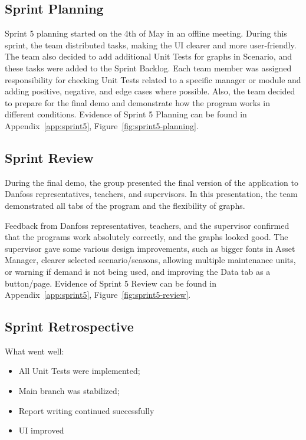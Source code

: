 

\subsection*{Sprint Planning}

Sprint 5 planning started on the 4th of May in an offline meeting. During this sprint, the team distributed tasks, making the UI clearer and more user-friendly. The team also decided to add additional Unit Tests for graphs in Scenario, and these tasks were added to the Sprint Backlog. Each team member was assigned responsibility for checking Unit Tests related to a specific manager or module and adding positive, negative, and edge cases where possible. Also, the team decided to prepare for the final demo and demonstrate how the program works in different conditions. Evidence of Sprint 5 Planning can be found in Appendix~\ref{app:sprint5}, Figure~\ref{fig:sprint5-planning}.


 

\subsection*{Sprint Review}

During the final demo, the group presented the final version of the application to Danfoss representatives, teachers, and supervisors. In this presentation, the team demonstrated all tabs of the program and the flexibility of graphs.

Feedback from Danfoss representatives, teachers, and the supervisor confirmed that the programs work absolutely correctly, and the graphs looked good. The supervisor gave some various design improvements, such as bigger fonts in Asset Manager, clearer selected scenario/seasons, allowing multiple maintenance units, or warning if demand is not being used, and improving the Data tab as a button/page. Evidence of Sprint 5 Review can be found in Appendix~\ref{app:sprint5}, Figure~\ref{fig:sprint5-review}.
 

\subsection*{Sprint Retrospective}

What went well:

\begin{itemize}

    \item All Unit Tests were implemented;

    \item Main branch was stabilized;

    \item Report writing continued successfully

    \item UI improved

\end{itemize}



